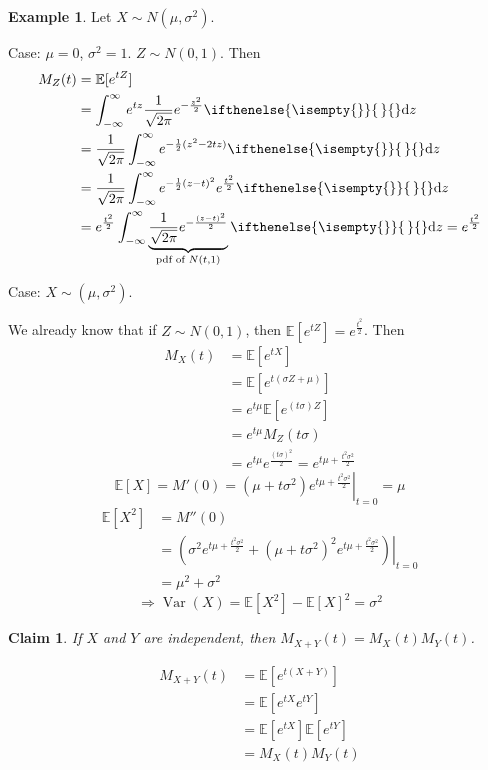 \documentclass[a4paper,11pt]{amsbook}
\makeatletter
\renewenvironment{proof}[1][\proofname]{\par
    \pushQED{\qed}%
    \normalfont \topsep6\p@\@plus6\p@\relax
    \trivlist
    \itemindent\z@ %
    \item[\hskip\labelsep
          \scshape
      #1\@addpunct{.}]\ignorespaces
}{%
    \popQED\endtrivlist\@endpefalse
}
\newtheorem{claim}{\hspace{-2em} \color{darkblue} Claim}[chapter]
\theoremstyle{definition}
\newtheorem{example}{\hspace{-2em} \color{darkblue} Example}[chapter]
\theoremstyle{remark}
\newcommand{\E}{\mathbb{E}}
\DeclareMathOperator\Var{Var}
\newcommand\0{\varnothing}
\newcommand\dz[1][]{\ifthenelse{\isempty{#1}}{\,}{}\mathrm{d}z}
\makeatother
\begin{document}
\begin{example}
    Let $X\sim N(\mu,\sigma^2)$.

    Case: $\mu=0$, $\sigma^2=1$. $Z\sim N(0,1)$.
    Then \begin{align*}
        M_Z(t)&=\E[e^{tZ}] \\
        &=\int_{-\infty}^\infty e^{tz}\frac{1}{\sqrt{2\pi}}e^{-\frac{z^2}{2}}\dz \\
        &=\frac{1}{\sqrt{2\pi}}\int_{-\infty}^\infty e^{-\frac{1}{2}(z^2-2tz)}\dz \\
        &=\frac{1}{\sqrt{2\pi}}\int_{-\infty}^\infty e^{-\frac{1}{2}(z-t)^2}e^{\frac{t^2}{2}}\dz \\
        &=e^{\frac{t^2}{2}}\int_{-\infty}^\infty \underbrace{\frac{1}{\sqrt{2\pi}}e^{-\frac{(z-t)^2}{2}}}_{\text{pdf of }N(t,1)}\dz=e^{\frac{t^2}{2}}
    \end{align*}

    Case: $X\sim(\mu,\sigma^2)$.

    We already know that if $Z\sim N(0,1)$, then $\E[e^{tZ}]=e^{\frac{t^2}{2}}$.
    Then \begin{align*}
        M_X(t)&=\E[e^{tX}] \\
        &=\E[e^{t(\sigma Z+\mu)}] \\
        &=e^{t\mu}\E[e^{(t\sigma)Z}] \\
        &=e^{t\mu}M_Z(t\sigma) \\
        &=e^{t\mu}e^{\frac{(t\sigma)^2}{2}}=e^{t\mu+\frac{t^2\sigma^2}{2}}
    \end{align*}
    $$\E[X]=M'(0)=\left.\left(\mu+t\sigma^2\right)e^{t\mu+\frac{t^2\sigma^2}{2}}\right|_{t=0}=\mu$$
    \begin{align*}
        \E[X^2]&=M''(0) \\
        &=\left.\left(\sigma^2e^{t\mu+\frac{t^2\sigma^2}{2}}+(\mu+t\sigma^2)^2e^{t\mu+\frac{t^2\sigma^2}{2}}\right)\right|_{t=0} \\
        &=\mu^2+\sigma^2
    \end{align*}
    $$\Rightarrow\Var(X)=\E[X^2]-\E[X]^2=\sigma^2$$
\end{example}

\begin{claim}
    If $X$ and $Y$ are independent, then $M_{X+Y}(t)=M_X(t)M_Y(t)$.
\end{claim}
\begin{proof}
    \begin{align*}
        M_{X+Y}(t)&=\E[e^{t(X+Y)}] \\
        &=\E[e^{tX}e^{tY}] \\
        &=\E[e^{tX}]\E[e^{tY}] \tag{independence} \\
        &=M_X(t)M_Y(t)
    \end{align*}
\end{proof}
\end{document}
